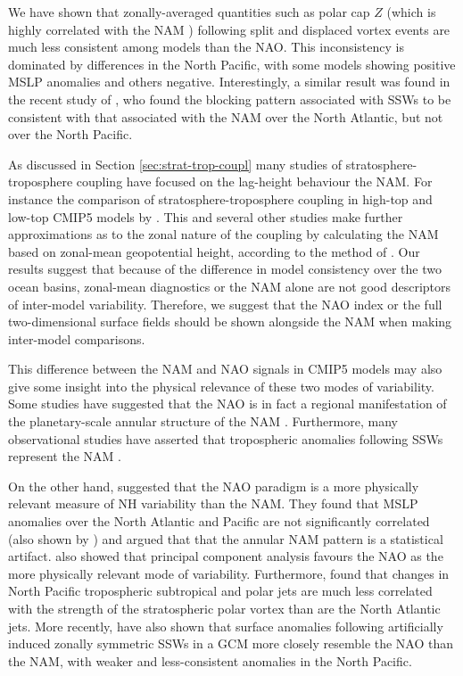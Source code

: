 We have shown that zonally-averaged quantities such as polar cap $Z$ (which is
highly correlated with the NAM \citep{Kushner2010}) following split and
displaced vortex events are much less consistent among models than the NAO. This
inconsistency is dominated by differences in the North Pacific, with some models
showing positive MSLP anomalies and others negative. Interestingly, a similar
result was found in the recent study of \citet{Davini2014}, who found the
blocking pattern associated with SSWs to be consistent with that associated with
the NAM over the North Atlantic, but not over the North Pacific. 

As discussed in Section \ref{sec:strat-trop-coupl} many studies of
stratosphere-troposphere coupling have focused on the lag-height behaviour the
NAM. For instance the comparison of stratosphere-troposphere coupling in
high-top and low-top CMIP5 models by \citet{Charlton-Perez2013}. This and
several other studies make further approximations as to the zonal nature of the
coupling by calculating the NAM based on zonal-mean geopotential height,
according to the method of \citet{Baldwin2009}. Our results suggest that because
of the difference in model consistency over the two ocean basins, zonal-mean
diagnostics or the NAM alone are not good descriptors of inter-model
variability. Therefore, we suggest that the NAO index or the full
two-dimensional surface fields should be shown alongside the NAM when making
inter-model comparisons.

This difference between the NAM and NAO signals in CMIP5 models may also give
some insight into the physical relevance of these two modes of variability. Some
studies have suggested that the NAO is in fact a regional manifestation of the
planetary-scale annular structure of the NAM \citep[e.g.,][]{Thompson1998,
  Wallace2002}. Furthermore, many observational studies have asserted that
tropospheric anomalies following SSWs represent the NAM
\citep[e.g.,][]{Baldwin1999,Baldwin2001a,Thompson2000}. 

On the other hand, \citet{Ambaum2001} suggested that the NAO paradigm is a more
physically relevant measure of NH variability than the NAM. They found that MSLP
anomalies over the North Atlantic and Pacific are not significantly correlated
(also shown by \citet{Deser2000}) and argued that that the annular NAM pattern
is a statistical artifact. \citet{Huth2006} also showed that principal component
analysis favours the NAO as the more physically relevant mode of
variability. Furthermore, \citet{Ambaum2002} found that changes in North Pacific
tropospheric subtropical and polar jets are much less correlated with the
strength of the stratospheric polar vortex than are the North Atlantic
jets. More recently, \citet{Hitchcock2014} have also shown that surface
anomalies following artificially induced zonally symmetric SSWs in a GCM more
closely resemble the NAO than the NAM, with weaker and less-consistent anomalies
in the North Pacific.

